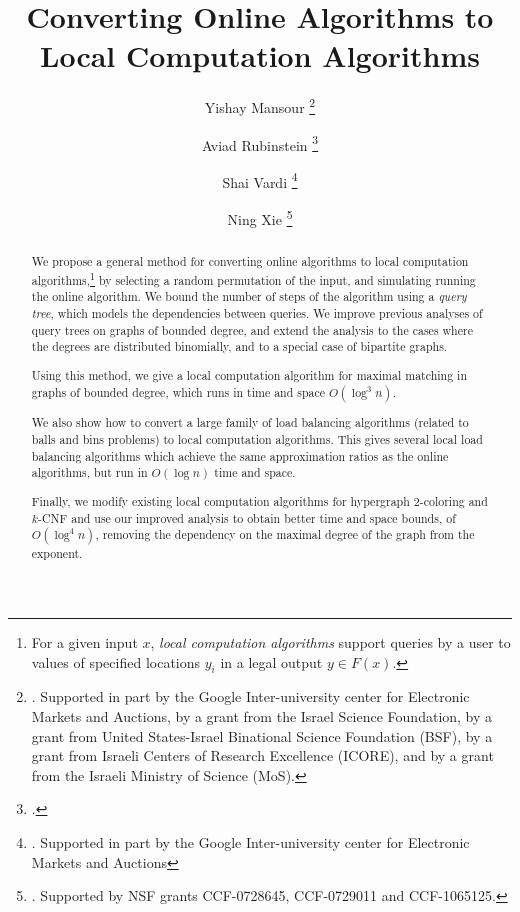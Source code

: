 \documentclass[english, oribibl]{llncs}
\begin{document}
\title{Converting Online Algorithms to Local Computation Algorithms}
\author{
Yishay Mansour 
\thanks{. Supported in part by the Google Inter-university center
for Electronic Markets and Auctions, by a grant from the Israel
Science Foundation, by a grant from United States-Israel Binational
Science Foundation (BSF), by a grant from Israeli Centers of Research Excellence (ICORE), and by a grant from the Israeli Ministry
of Science (MoS).}
\and
Aviad Rubinstein
\thanks{ .}
\and
Shai Vardi
\thanks{. Supported in part by the Google Inter-university center
for Electronic Markets and Auctions }
\and
Ning Xie
\thanks{. Supported by NSF grants CCF-0728645, CCF-0729011 and CCF-1065125.}
}


\date{}

\setcounter{page}{1}
\setcounter{secnumdepth}{3}
\maketitle

\begin{abstract}

We propose a general method for converting online algorithms to local computation algorithms,\footnote{For a given input $x$, \emph{local computation algorithms} support queries by a user to values of specified locations $y_i$ in a legal output $y \in F(x)$.} by selecting a random permutation of the input, and simulating running the online algorithm. We bound the number of steps of the algorithm using a \emph{query tree}, which models the dependencies between queries. We improve previous analyses of query trees on graphs of bounded degree, and extend the analysis to the cases where the degrees are distributed binomially, and to a special case of bipartite graphs.



Using this method, we give a local computation algorithm for maximal matching in graphs of bounded degree, which runs in time and space $O(\log^3{n})$.

We also show how to convert a large family of load balancing algorithms (related to balls and bins problems) to local computation algorithms. This gives several local load balancing algorithms which achieve the same approximation ratios as the online algorithms, but run in $O(\log{n})$ time and space.

Finally, we modify existing local computation algorithms for hypergraph $2$-coloring and $k$-CNF and use our improved analysis to obtain better time and space bounds, of $O(\log^4{n})$, removing the dependency on the maximal degree of the graph from the exponent.
\end{abstract}
\end{document}
